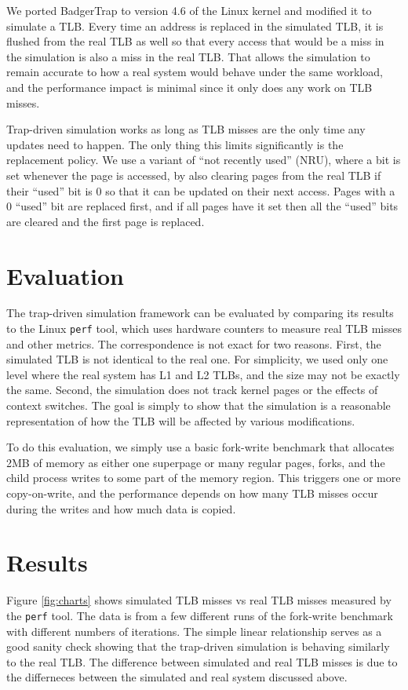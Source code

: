 We ported BadgerTrap to version 4.6 of the Linux kernel and modified it to simulate a TLB. Every time an address is replaced in the simulated TLB, it is flushed from the real TLB as well so that every access that would be a miss in the simulation is also a miss in the real TLB. That allows the simulation to remain accurate to how a real system would behave under the same workload, and the performance impact is minimal since it only does any work on TLB misses.

Trap-driven simulation works as long as TLB misses are the only time any updates need to happen. The only thing this limits significantly is the replacement policy. We use a variant of ``not recently used'' (NRU), where a bit is set whenever the page is accessed, by also clearing pages from the real TLB if their ``used'' bit is 0 so that it can be updated on their next access. Pages with a 0 ``used'' bit are replaced first, and if all pages have it set then all the ``used'' bits are cleared and the first page is replaced.

\section{Evaluation}
The trap-driven simulation framework can be evaluated by comparing its results to the Linux \verb|perf| tool, which uses hardware counters to measure real TLB misses and other metrics. The correspondence is not exact for two reasons. First, the simulated TLB is not identical to the real one. For simplicity, we used only one level where the real system has L1 and L2 TLBs, and the size may not be exactly the same. Second, the simulation does not track kernel pages or the effects of context switches. The goal is simply to show that the simulation is a reasonable representation of how the TLB will be affected by various modifications.

To do this evaluation, we simply use a basic fork-write benchmark that allocates 2MB of memory as either one superpage or many regular pages, forks, and the child process writes to some part of the memory region. This triggers one or more copy-on-write, and the performance depends on how many TLB misses occur during the writes and how much data is copied.

\section{Results}

Figure \ref{fig:charts} shows simulated TLB misses vs real TLB misses measured by the \verb|perf| tool. The data is from a few different runs of the fork-write benchmark with different numbers of iterations. The simple linear relationship serves as a good sanity check showing that the trap-driven simulation is behaving similarly to the real TLB. The difference between simulated and real TLB misses is due to the differneces between the simulated and real system discussed above.

